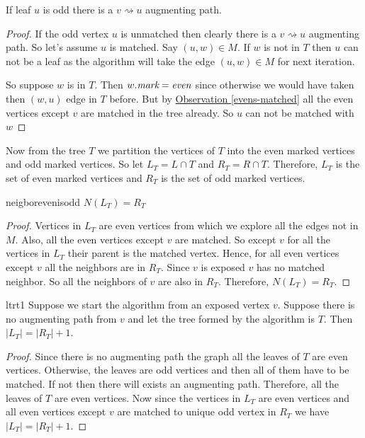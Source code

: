 \begin{lemma}{}{}
	If leaf $u$ is odd there is a $v\rightsquigarrow u$ augmenting path.
\end{lemma}
\begin{proof}
	If the odd vertex $u$ is unmatched then clearly there is a $v\rightsquigarrow u$ augmenting path. So let's assume $u$ is matched. Say $(u,w)\in M$. If $w$ is not in $T$ then $u$ can not be a leaf as the algorithm will take the edge $(u,w)\in M$ for next iteration.

	So suppose $w$ is in $T$. Then $w.\emph{mark}=\emph{even}$ since otherwise we would have taken then $(w,u)$ edge in $T$ before. But by \hyperref[evens-matched]{Observation \ref{evens-matched}} all the even vertices except $v$ are matched in the tree already. So $u$ can not be matched with $w$
\end{proof}

Now from the tree $T$ we partition the vertices of $T$ into the even marked vertices and odd marked vertices. So let $L_T=L\cap T$ and $R_T=R\cap T$. Therefore, $L_T$ is the set of even marked vertices and $R_T$ is the set of odd marked vertices.
\begin{lemma}{}{neigborevenisodd}
	$N(L_T)=R_T$
\end{lemma}
\begin{proof}
	Vertices in $L_T$ are even vertices from which we explore all the edges not in $M$. Also, all the even vertices except $v$ are matched. So except $v$ for all the vertices in $L_T$ their parent is the matched vertex. Hence, for all even vertices except $v$ all the neighbors are in $R_T$.  Since $v$ is exposed $v$ has no matched neighbor. So all the neighbors of $v$ are also in $R_T$. Therefore, $N(L_T)=R_T$.
\end{proof}
\begin{lemma}{}{ltrt1}
	Suppose we start the algorithm from an exposed vertex $v$. Suppose there is no augmenting path from $v$ and let the tree formed by the algorithm is $T$. Then $|L_T|=|R_T|+1$.
\end{lemma}
\begin{proof}
	Since there is no augmenting path the graph all the leaves of $T$ are even vertices. Otherwise, the leaves are odd vertices and then all of them have to be matched. If not then there will exists an augmenting path. Therefore, all the leaves of $T$ are even vertices. Now since the vertices in $L_T$ are even vertices and all even vertices except $v$ are matched to unique odd vertex in $R_T$ we have $|L_T|=|R_T|+1$.
\end{proof}

